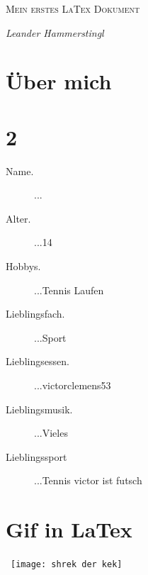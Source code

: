 \documentclass[12pt, a4paper]{article} %
\begin{document}

\thispagestyle{empty}

\begin{title}
	
	\vspace{5cm}
	
	{\scshape\Huge Mein erstes LaTex Dokument \par}

	\vspace{5cm}
	{\Large\itshape Leander Hammerstingl
	\par} %
	

\end{title}

\newpage

\tableofcontents %

\newpage

\section{\"Uber mich}
\section{2}  \label{sec:2}

\begin{description}
\item[Name.]
... %
\item[Alter.] 
...14
\item[Hobbys.]
...Tennis Laufen
\item[Lieblingsfach.]
...Sport
\item[Lieblingsessen.]
...victorclemens53
\item[Lieblingsmusik.]
...Vieles
\item[Lieblingssport] %
...Tennis victor ist futsch

\end{description}

\section{Gif in LaTex}
\	\texttt{[image: shrek der kek]}
\end{document}
